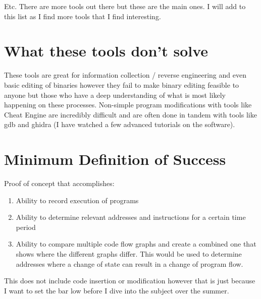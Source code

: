 \begin{itemize}
\end{itemize}


Etc. There are more tools out there but these are the main ones. I will add to this list as I find more tools that I find interesting. 

\section{What these tools don't solve}

These tools are great for information collection / reverse engineering and even basic editing of binaries however they fail to make binary editing feasible to anyone but those who have a deep understanding of what is most likely happening on these processes. Non-simple program modifications with tools like Cheat Engine are incredibly difficult and are often done in tandem with tools like gdb and ghidra (I have watched a few advanced tutorials on the software). 

\section{Minimum Definition of Success}
Proof of concept that accomplishes:
\begin{enumerate}
    \item Ability to record execution of programs
    \item Ability to determine relevant addresses and instructions for a certain time period
    \item Ability to compare multiple code flow graphs and create a combined one that shows where the different graphs differ. This would be used to determine addresses where a change of state can result in a change of program flow.
\end{enumerate}

This does not include code insertion or modification however that is just because I want to set the bar low before I dive into the subject over the summer. 


